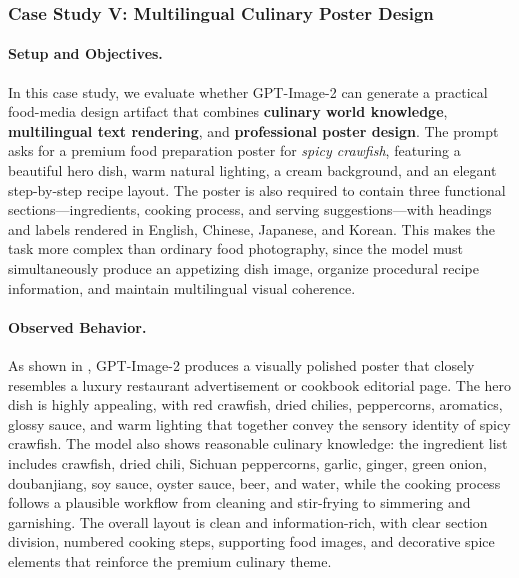 \subsubsection{Case Study V: Multilingual Culinary Poster Design}

\paragraph{Setup and Objectives.}
In this case study, we evaluate whether GPT-Image-2 can generate a practical food-media design artifact that combines \textbf{culinary world knowledge}, \textbf{multilingual text rendering}, and \textbf{professional poster design}. The prompt asks for a premium food preparation poster for \emph{spicy crawfish}, featuring a beautiful hero dish, warm natural lighting, a cream background, and an elegant step-by-step recipe layout. The poster is also required to contain three functional sections---ingredients, cooking process, and serving suggestions---with headings and labels rendered in English, Chinese, Japanese, and Korean. This makes the task more complex than ordinary food photography, since the model must simultaneously produce an appetizing dish image, organize procedural recipe information, and maintain multilingual visual coherence.

\paragraph{Observed Behavior.}
As shown in , GPT-Image-2 produces a visually polished poster that closely resembles a luxury restaurant advertisement or cookbook editorial page. The hero dish is highly appealing, with red crawfish, dried chilies, peppercorns, aromatics, glossy sauce, and warm lighting that together convey the sensory identity of spicy crawfish. The model also shows reasonable culinary knowledge: the ingredient list includes crawfish, dried chili, Sichuan peppercorns, garlic, ginger, green onion, doubanjiang, soy sauce, oyster sauce, beer, and water, while the cooking process follows a plausible workflow from cleaning and stir-frying to simmering and garnishing. The overall layout is clean and information-rich, with clear section division, numbered cooking steps, supporting food images, and decorative spice elements that reinforce the premium culinary theme.


